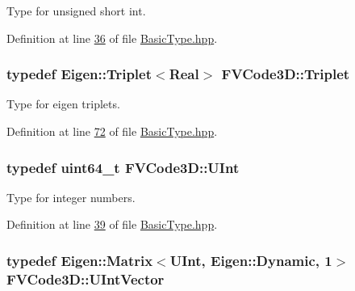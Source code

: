 Type for unsigned short int. 



Definition at line \hyperlink{BasicType_8hpp_source_l00036}{36} of file \hyperlink{BasicType_8hpp_source}{Basic\+Type.\+hpp}.

\subsubsection[{\texorpdfstring{Triplet}{Triplet}}]{\setlength{\rightskip}{0pt plus 5cm}typedef Eigen\+::\+Triplet$<${\bf Real}$>$ {\bf F\+V\+Code3\+D\+::\+Triplet}}\hypertarget{namespaceFVCode3D_a1d6853f6847ee83d6e823a500a8232fd}{}\label{namespaceFVCode3D_a1d6853f6847ee83d6e823a500a8232fd}


Type for eigen triplets. 



Definition at line \hyperlink{BasicType_8hpp_source_l00072}{72} of file \hyperlink{BasicType_8hpp_source}{Basic\+Type.\+hpp}.

\subsubsection[{\texorpdfstring{U\+Int}{UInt}}]{\setlength{\rightskip}{0pt plus 5cm}typedef uint64\+\_\+t {\bf F\+V\+Code3\+D\+::\+U\+Int}}\hypertarget{namespaceFVCode3D_a4bf7e328c75d0fd504050d040ebe9eda}{}\label{namespaceFVCode3D_a4bf7e328c75d0fd504050d040ebe9eda}


Type for integer numbers. 



Definition at line \hyperlink{BasicType_8hpp_source_l00039}{39} of file \hyperlink{BasicType_8hpp_source}{Basic\+Type.\+hpp}.

\subsubsection[{\texorpdfstring{U\+Int\+Vector}{UIntVector}}]{\setlength{\rightskip}{0pt plus 5cm}typedef Eigen\+::\+Matrix$<${\bf U\+Int}, Eigen\+::\+Dynamic, 1$>$ {\bf F\+V\+Code3\+D\+::\+U\+Int\+Vector}}\hypertarget{namespaceFVCode3D_a9c3dcef0872c1dbd4aaf770d08421fd7}{}\label{namespaceFVCode3D_a9c3dcef0872c1dbd4aaf770d08421fd7}


